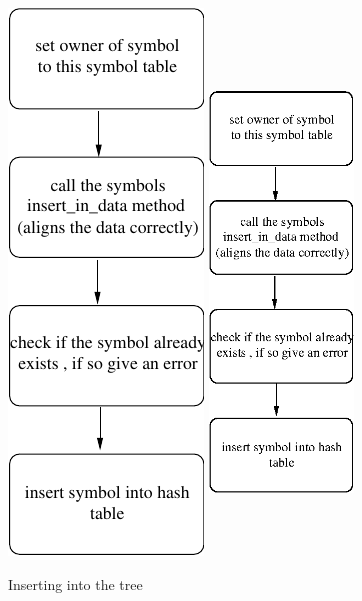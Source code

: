 \documentclass [a4paper,12pt]{article}
\begin{document}
\begin{figure}
\ifpdf
\includegraphics{arch5.pdf}
\else
\includegraphics[width=1.51in,height=5.51in]{arch5.eps}
\fi
\label{fig5}
\caption{Inserting into the tree}
\end{figure}
\end{document}
